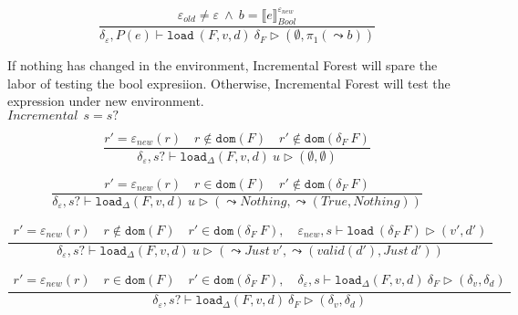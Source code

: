 \documentclass[10pt,twoside,a4paper]{article}
\theoremstyle{theorem}
\theoremstyle{lemma}
\theoremstyle{property}
\theoremstyle{definition}
\theoremstyle{assumption}
\def\fst{\pi_1}
\begin{document}
\begin{displaymath}
	\frac{ \varepsilon_{old} \not= \varepsilon ~\wedge~  b = \llbracket e \rrbracket^{\varepsilon_{new}}_{Bool}}
	{\delta_\varepsilon, P(e) \vdash \mathtt{load}~ (F,v,d) ~\delta_F \rhd (\emptyset,\fst(\leadsto b))}
\end{displaymath}

If nothing has changed in the environment, Incremental Forest will spare the labor of testing the bool expresiion. Otherwise, Incremental Forest will test the expression under new environment.\\

$\boxed{Incremental~~s = s?}$

\begin{displaymath}
	\frac{
		r' = \varepsilon_{new}(r) \quad r \notin \mathtt{dom}(F) \quad r' \notin \mathtt{dom}(\delta_F~F)
	}
	{\delta_\varepsilon, s? \vdash \mathtt{load}_\Delta (F,v,d)~ u \rhd (\emptyset, \emptyset)}
\end{displaymath}

\begin{displaymath}
	\frac{
		r' = \varepsilon_{new}(r)  \quad r \in \mathtt{dom}(F) \quad r' \notin \mathtt{dom}(\delta_F~F)
	}
	{\delta_\varepsilon, s? \vdash \mathtt{load}_\Delta (F,v,d)~ u \rhd (\leadsto Nothing,\leadsto (True,Nothing))}
\end{displaymath}

\begin{displaymath}
	\frac{\begin{array}{c}
	r' = \varepsilon_{new}(r) \quad r \notin \mathtt{dom}(F) \quad r' \in \mathtt{dom}(\delta_F~F), \quad
		\varepsilon_{new}, s \vdash \mathtt{load}~ (\delta_F~F) \rhd (v',d')
	\end{array}}
	{\delta_\varepsilon, s? \vdash \mathtt{load}_\Delta (F,v,d)~ u \rhd (\leadsto Just~v',\leadsto (valid(d'),Just~d'))}
\end{displaymath}

\begin{displaymath}
	\frac{\begin{array}{c}
	r' = \varepsilon_{new}(r) \quad r \in \mathtt{dom}(F) \quad r' \in \mathtt{dom}(\delta_F~F), \quad
		\delta_\varepsilon, s \vdash \mathtt{load}_\Delta (F,v,d)~ \delta_F \rhd (\delta_v,\delta_d)
	\end{array}}
	{\delta_\varepsilon, s? \vdash \mathtt{load}_\Delta (F,v,d)~ \delta_F \rhd (\delta_v,\delta_d)}
\end{displaymath}
\end{document}
